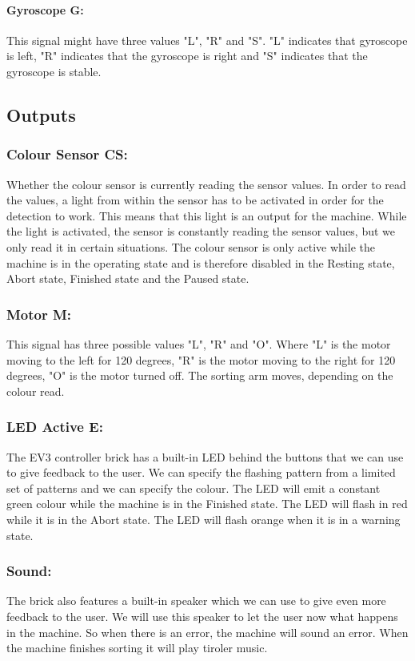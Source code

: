 \documentclass[a4paper,oneside,11pt]{article}
\begin{document}
\paragraph{Gyroscope G:} This signal might have three values "L", "R" and "S". "L" indicates that gyroscope is left, "R" indicates that the gyroscope is right and "S" indicates that the gyroscope is stable.

\subsection{Outputs}
\subsubsection{Colour Sensor CS:} Whether the colour sensor is currently reading the sensor values. In order to read the values, a light from within the sensor has to be activated in order for the detection to work. This means that this light is an output for the machine. While the light is activated, the sensor is constantly reading the sensor values, but we only read it in certain situations. The colour sensor is only active while the machine is in the operating state and is therefore disabled in the Resting state, Abort state, Finished state and the Paused state.
\subsubsection{Motor M:} This signal has three possible values "L", "R" and "O". Where "L" is the motor moving to the left for 120 degrees, "R" is the motor moving to the right for 120 degrees, "O" is the motor turned off. The sorting arm moves, depending on the colour read.
\subsubsection{LED Active E:} The EV3 controller brick has a built-in LED behind the buttons that we can use to give feedback to the user. We can specify the flashing pattern from a limited set of patterns and we can specify the colour. The LED will emit a constant green colour while the machine is in the Finished state. The LED will flash in red while it is in the Abort state. The LED will flash orange when it is in a warning state.
\subsubsection{Sound:} The brick also features a built-in speaker which we can use to give even more feedback to the user. We will use this speaker to let the user now what happens in the machine. So when there is an error, the machine will sound an error. When the machine finishes sorting it will play tiroler music.
\end{document}
